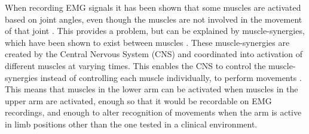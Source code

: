 When recording EMG signals it has been shown that some muscles are activated based on joint angles, even though the muscles are not involved in the movement of that joint \cite{Fougner2011}. This provides a problem, but can be explained by muscle-synergies, which have been shown to exist between muscles \cite{DeRugy2013}. These muscle-synergies are created by the Central Nervous System (CNS) and coordinated into activation of different muscles at varying times. This enables the CNS to control the muscle-synergies instead of controlling each muscle individually, to perform movements \cite{jinang2009}. This means that muscles in the lower arm can be activated when muscles in the upper arm are activated, enough so that it would be recordable on EMG recordings, and enough to alter recognition of movements when the arm is active in limb positions other than the one tested in a clinical environment. 

